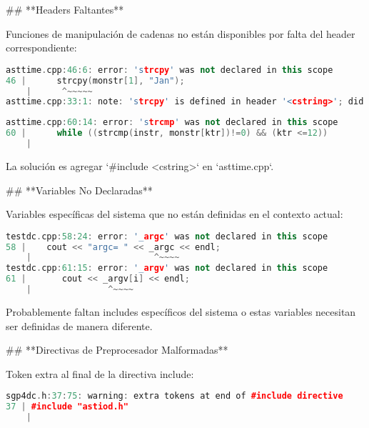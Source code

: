 \documentclass[12pt,a4paper]{article}
\begin{document}
\begin{markdown}
## **Headers Faltantes**

Funciones de manipulación de cadenas no están disponibles por falta del header correspondiente:
\end{markdown}

\begin{lstlisting}[language=C++]
asttime.cpp:46:6: error: 'strcpy' was not declared in this scope
46 |      strcpy(monstr[1], "Jan");
    |      ^~~~~~
asttime.cpp:33:1: note: 'strcpy' is defined in header '<cstring>'; did you forget to '#include <cstring>'?
\end{lstlisting}

\begin{lstlisting}[language=C++]
asttime.cpp:60:14: error: 'strcmp' was not declared in this scope
60 |      while ((strcmp(instr, monstr[ktr])!=0) && (ktr <=12))
    |    
\end{lstlisting}

La solución es agregar `\#include <cstring>` en `asttime.cpp`.


\begin{markdown}
## **Variables No Declaradas**

Variables específicas del sistema que no están definidas en el contexto actual:
    
\end{markdown}

\begin{lstlisting}[language=C++]
testdc.cpp:58:24: error: '_argc' was not declared in this scope
58 |    cout << "argc= " << _argc << endl;
    |                        ^~~~~
testdc.cpp:61:15: error: '_argv' was not declared in this scope
61 |       cout << _argv[i] << endl;
    |               ^~~~~
\end{lstlisting}

Probablemente faltan includes específicos del sistema o estas variables necesitan ser definidas de manera diferente.



\begin{markdown}
## **Directivas de Preprocesador Malformadas**

Token extra al final de la directiva include:
\end{markdown}

\begin{lstlisting}[language=C++]
sgp4dc.h:37:75: warning: extra tokens at end of #include directive
37 | #include "astiod.h"                                                       `
    |                                                                           ^
\end{lstlisting}
\end{document}
